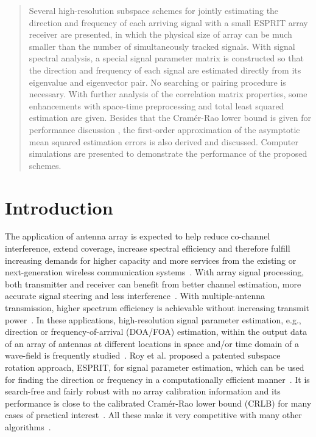 \documentclass[conference]{IEEEtran}
\begin{document}
\begin{abstract}
Several high-resolution subspace schemes for jointly estimating
the direction and frequency of each arriving signal with a small
ESPRIT array receiver are presented, in which the physical size of
array can be much smaller than the number of simultaneously
tracked signals. With signal spectral analysis, a special signal
parameter matrix is constructed so that the direction and
frequency of each signal are estimated directly from its
eigenvalue and eigenvector pair. No searching or pairing procedure
is necessary. With further analysis of the correlation matrix
properties, some enhancements with space-time preprocessing and
total least squared estimation are given. Besides that the
Cram\'er-Rao lower bound is given for performance discussion , the
first-order approximation of the asymptotic mean squared
estimation errors is also derived and discussed. Computer
simulations are presented to demonstrate the performance of the
proposed schemes.
\end{abstract}
\section{Introduction}
The application of antenna array is expected to help reduce
co-channel interference, extend coverage, increase spectral
efficiency and therefore fulfill increasing demands for higher
capacity and more services from the existing or next-generation
wireless communication systems~\cite{Ghav05,Dohl07}. With array
signal processing, both transmitter and receiver can benefit from
better channel estimation, more accurate signal steering and less
interference~\cite{Ghav05}. With multiple-antenna transmission,
higher spectrum efficiency is achievable without increasing
transmit power~\cite{Dohl07}. In these applications,
high-resolution signal parameter estimation, e.g., direction or
frequency-of-arrival (DOA/FOA) estimation, within the output data
of an array of antennas at different locations in space and/or
time domain of a wave-field is frequently studied~\cite{Ghav05}.
Roy et al. proposed a patented subspace rotation approach, ESPRIT,
for signal parameter estimation, which can be used for finding the
direction or frequency in a computationally efficient
manner~\cite{Roy89}. It is search-free and fairly robust with no
array calibration information and its performance is close to the
calibrated Cram\'er-Rao lower bound (CRLB) for many cases of
practical interest~\cite{Roy89}. All these make it very
competitive with many other algorithms~\cite{Ghav05}.
\end{document}
